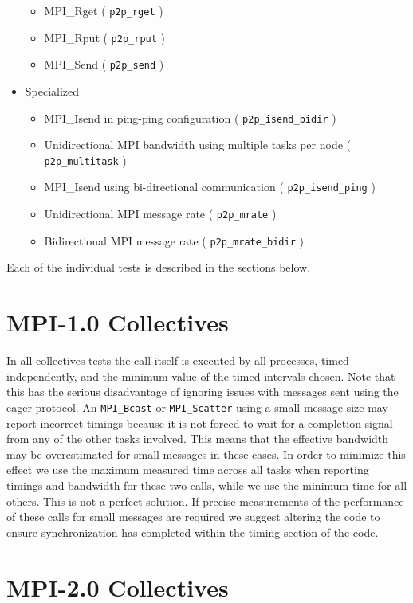 \documentclass[10pt,a4paper]{report}
\begin{document}
\begin{itemize}
\begin{itemize}
	\item{MPI\_Rget ( \texttt{p2p\_rget} )}
	\item{MPI\_Rput ( \texttt{p2p\_rput} )}
	\item{MPI\_Send ( \texttt{p2p\_send} )}
\end{itemize}
\item{Specialized}
\begin{itemize}
	\item{MPI\_Isend in ping-ping configuration ( \texttt{p2p\_isend\_bidir} )}
	\item{Unidirectional MPI bandwidth using multiple tasks per node ( \texttt{p2p\_multitask} )}
	\item{MPI\_Isend using bi-directional communication ( \texttt{p2p\_isend\_ping} )}
	\item{Unidirectional MPI message rate ( \texttt{p2p\_mrate} )}
	\item{Bidirectional MPI message rate ( \texttt{p2p\_mrate\_bidir} )}
\end{itemize}
\end{itemize}

Each of the individual tests is described in the sections below.

\section{MPI-1.0 Collectives}
\label{sec:collectives}

In all collectives tests the call itself is executed by all processes, timed independently, and the minimum value of the timed intervals chosen. Note that this has the serious disadvantage of ignoring issues with messages sent using the eager protocol. An \verb+MPI_Bcast+ or \verb+MPI_Scatter+ using a small message size may report incorrect timings because it is not forced to wait for a completion signal from any of the other tasks involved. This means that the effective bandwidth may be overestimated for small messages in these cases. In order to minimize this effect we use the maximum measured time across all tasks when reporting timings and bandwidth for these two calls, while we use the minimum time for all others. This is not a perfect solution. If precise measurements of the performance of these calls for small messages are required we suggest altering the code to ensure synchronization has completed within the timing section of the code. 

\section{MPI-2.0 Collectives}
\end{document}
